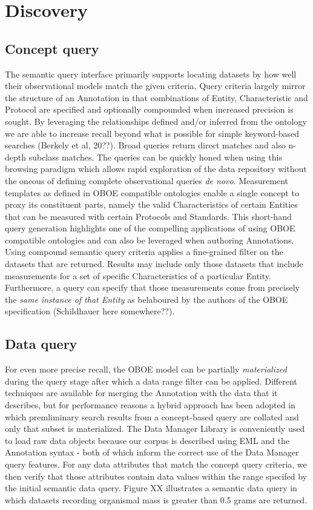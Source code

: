 
\section{Discovery}

\subsection{Concept query}
The semantic query interface primarily supports locating datasets by how well their observational models match the given criteria. Query criteria largely mirror the structure of an Annotation in that combinations of Entity, Characteristic and Protocol are specified and optionally compounded when increased precision is sought. 
By leveraging the relationships defined and/or inferred from the ontology we are able to increase recall beyond what is possible for simple keyword-based searches (Berkely et al, 20??). Broad queries return direct matches and also n-depth subclass matches. The queries can be quickly honed when using this browsing paradigm which allows rapid exploration of the data repository without the oneous of defining complete observational queries \emph{de novo}. Measurement templates as defined in OBOE compatible ontologies enable a single concept to proxy its constituent parts, namely the valid Characteristics of certain Entities that can be measured with certain Protocols and Standards. This short-hand query generation highlights one of the compelling applications of using OBOE compatible ontologies and can also be leveraged when authoring Annotations.
Using compound semantic query criteria applies a fine-grained filter on the datasets that are returned. Results may include only those datasets that include measurements for a set of specific Characteristics of a particular Entity. Furthermore, a query can specify that those measurements come from precisely the \emph{same instance of that Entity} as belaboured by the authors of the OBOE specification (Schildhauer here somewhere??).

\subsection{Data query}
For even more precise recall, the OBOE model can be partially \emph{materialized} during the query stage after which a data range filter can be applied. Different techniques are available for merging the Annotation with the data that it describes, but for performance reasons a hybrid approach has been adopted in which premliminary search results from a concept-based query are collated and only that subset is materialized. The Data Manager Library is conveniently used to load raw data objects because our corpus is described using EML and the Annotation syntax - both of which inform the correct use of the Data Manager query features. For any data attributes that match the concept query criteria, we then verify that those attributes contain data values within the range specifed by the initial semantic data query. Figure XX illustrates a semantic data query in which datasets recording organismal mass is greater than 0.5 grams are returned.

